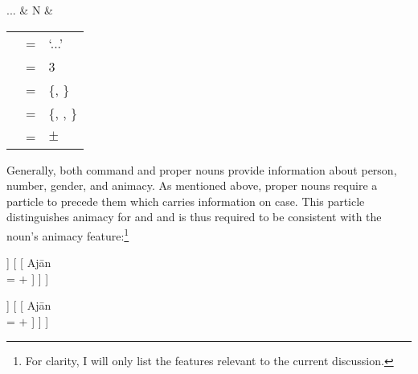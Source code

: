 	\begin{tabu} {}
	...
		& N
		& \begin{tabular}[t]{l l l}
			\ups{\Pred} & = & `...' \\
			\ups{\Pers} & = & 3 \\
			\ups{\Num} & = & \{\Sg{}, \Pl{}\} \\
			\ups{\Gend} & = & \{\M{}, \F{}, \N{}\} \\
			\ups{\Anim} & = & $\pm$ \\
		\end{tabular}
	\end{tabu}

\xe

Generally, both command and proper nouns provide information about person, 
number, gender, and animacy. As mentioned above, proper nouns require a 
particle to precede them which carries information on case. This particle 
distinguishes animacy for \Aarg{} and \Parg{} and is thus required to be 
consistent with the noun's animacy feature:\footnote{For clarity, I will only 
list the features relevant to the current discussion.}

\ex{}%
\begin{minipage}[t]{.5\linewidth}
\tl\label{ex:animok}\quad %
\begin{forest}
[{%
\xhead{N} \\
\ups{\Anim} = $+$ \\
\ups{\Case} = \Parg{}
}
	[\^P
		[{%
			sa \\
			\ups{\Anim} \req{} $+$ \\
			\ups{\Case} = \Parg{}
		}]
	]
	[
		[{%
			Ajān \\
			\ups{\Anim} = $+$
		}]
	]
]
\end{forest}
\end{minipage}
\begin{minipage}[t]{.5\linewidth}
\tl\label{ex:animclash}\quad %
\ljudge*\begin{forest}
[{%
\xhead{N} \\
\ups{\Anim} = \err{} \\
\ups{\Case} = \Parg{}
}
	[\^P
		[{%
			le \\
			\ups{\Anim} \req{} $-$ \\
			\ups{\Case} = \Parg{}
		}]
	]
	[
		[{%
			Ajān \\
			\ups{\Anim} = $+$
		}]
	]
]
\end{forest}
\end{minipage}
\xe

